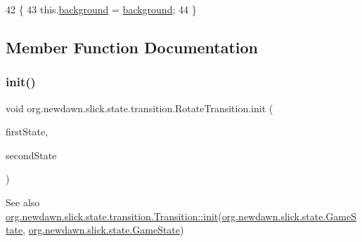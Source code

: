 \begin{DoxyCode}
42                                               \{
43         this.\mbox{\hyperlink{classorg_1_1newdawn_1_1slick_1_1state_1_1transition_1_1_rotate_transition_a8ab02534f280fe5883c5348a1eb399b2}{background}} = \mbox{\hyperlink{classorg_1_1newdawn_1_1slick_1_1state_1_1transition_1_1_rotate_transition_a8ab02534f280fe5883c5348a1eb399b2}{background}};
44     \}
\end{DoxyCode}


\subsection{Member Function Documentation}
\mbox{\label{classorg_1_1newdawn_1_1slick_1_1state_1_1transition_1_1_rotate_transition_a527c48345f18db529a56719c5647bd94}} 
\subsubsection{\texorpdfstring{init()}{init()}}
{\footnotesize\ttfamily void org.\+newdawn.\+slick.\+state.\+transition.\+Rotate\+Transition.\+init (\begin{DoxyParamCaption}\item[{\mbox{\hyperlink{interfaceorg_1_1newdawn_1_1slick_1_1state_1_1_game_state}{Game\+State}}}]{first\+State,  }\item[{\mbox{\hyperlink{interfaceorg_1_1newdawn_1_1slick_1_1state_1_1_game_state}{Game\+State}}}]{second\+State }\end{DoxyParamCaption})\hspace{0.3cm}{\ttfamily [inline]}}

\begin{DoxySeeAlso}{See also}
\mbox{\hyperlink{interfaceorg_1_1newdawn_1_1slick_1_1state_1_1transition_1_1_transition_a7b59f0c9205f1f0417ee18bc526e5b01}{org.\+newdawn.\+slick.\+state.\+transition.\+Transition\+::init}}(\mbox{\hyperlink{interfaceorg_1_1newdawn_1_1slick_1_1state_1_1_game_state}{org.\+newdawn.\+slick.\+state.\+Game\+State}}, \mbox{\hyperlink{interfaceorg_1_1newdawn_1_1slick_1_1state_1_1_game_state}{org.\+newdawn.\+slick.\+state.\+Game\+State}}) 
\end{DoxySeeAlso}


